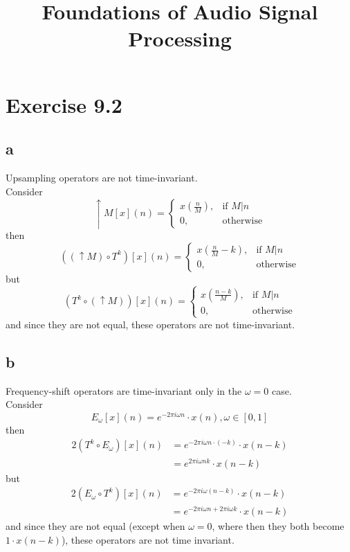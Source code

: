 \documentclass[12pt]{article}
\title{Foundations of Audio Signal Processing\\ \ass}
\author{\auth}
\begin{document}
	\maketitle
	\section*{Exercise 9.2}
	\subsection*{a} Upsampling operators are not time-invariant.\\
	Consider
	\begin{equation}
		\uparrow M[x](n) = \begin{cases}
		x(\frac{n}{M}), & \mbox{if } M\vert n\\ 
		0, & \mbox{otherwise}
		\end{cases}
	\end{equation}
	then
	\begin{equation}
		((\uparrow M)\circ T^k)[x](n) = \begin{cases}
		x(\frac{n}{M} - k), & \mbox{if } M\vert n\\
		0, & \mbox{otherwise}
		\end{cases}
	\end{equation}
	but
	\begin{equation}
	(T^k \circ (\uparrow M))[x](n) = \begin{cases}
	x(\frac{n-k}{M}), & \mbox{if } M\vert n\\
	0, & \mbox{otherwise}
	\end{cases}
	\end{equation}
	and since they are not equal, these operators are not time-invariant.
	
	\subsection*{b} Frequency-shift operators are time-invariant only in the $\omega = 0$ case.\\
	Consider
	\begin{equation}
		E_\omega[x](n) = e^{-2\pi i \omega n} \cdot x(n), \omega \in [0,1]
	\end{equation}
	then
	\begin{alignat}{2}
		(T^k \circ E_\omega)[x](n) &= e^{-2\pi i \omega n \cdot (- k)} \cdot x(n-k)\\
		&= e^{2\pi i \omega n k} \cdot x(n-k)
	\end{alignat}
	but
	\begin{alignat}{2}
		(E_\omega \circ T^k)[x](n) &= e^{-2\pi i \omega (n - k)} \cdot x(n-k)\\
		&= e^{-2\pi i \omega n + 2\pi i \omega k} \cdot x(n-k)
	\end{alignat}
	and since they are not equal (except when $\omega=0$, where then they both become $1 \cdot x(n-k)$), these operators are not time invariant.
\end{document}
